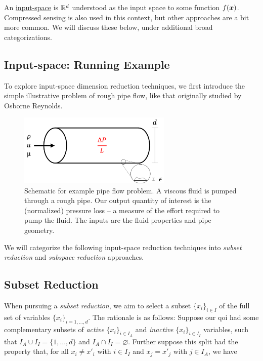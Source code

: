 \documentclass{article}
\begin{document}
\bigskip\noindent An \underline{input-space} is $\mathbb{R}^{d}$ understood as the input
space to some function $f(\boldsymbol{x})$. Compressed sensing is also used in this
context,\cite{tang2014subsampled} but other approaches are a bit more common. We
will discuss these below, under additional broad categorizations.

\subsection{Input-space: Running Example}
To explore input-space dimension reduction techniques, we first introduce the
simple illustrative problem of rough pipe flow, like that originally studied by
Osborne Reynolds.\cite{reynolds1883}

\begin{figure}[!ht]
  \centering
  \includegraphics[width=0.65\textwidth]{../../images/pipe_diagram}
  \caption{Schematic for example pipe flow problem. A viscous fluid is pumped
    through a rough pipe. Our output quantity of interest is the (normalized)
    pressure loss -- a measure of the effort required to pump the fluid. The
    inputs are the fluid properties and pipe geometry.}
  \label{fig:pipe_diagram}
\end{figure}

We will categorize the following input-space reduction techniques into
\emph{subset reduction} and \emph{subspace reduction} approaches.

\subsection{Subset Reduction}
When pursuing a \emph{subset reduction}, we aim to select a subset
$\{x_i\}_{i\in I}$ of the full set of variables $\{x_i\}_{i=1,\dots,d}$. The
rationale is as follows: Suppose our qoi had some complementary subsets of
\emph{active} $\{x_i\}_{i\in I_A}$ and \emph{inactive} $\{x_i\}_{i\in I_I}$
variables, such that $I_A\cup I_I = \{1,\dots,d\}$ and $I_A\cap
I_I=\varnothing$. Further suppose this split had the property that, for all
$x_i\neq x'_i$ with $i\in I_I$ and $x_j=x'_j$ with $j\in I_A$, we have
\end{document}
